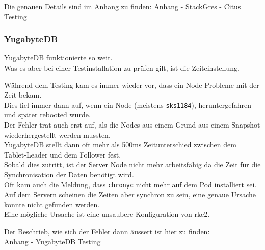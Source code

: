 \begin{flushleft}
    
    Die genauen Details sind im Anhang zu finden:
    \hyperref[subsec:appendix_testing_stackgres_citus]{Anhang - StackGres - Citus Testing}
\end{flushleft}
\begin{flushleft}
    \subsubsection{YugabyteDB}
    YugabyteDB funktionierte so weit.\\
    
    Was es aber bei einer Testinstallation zu prüfen gilt, ist die Zeiteinstellung.
\end{flushleft}
\begin{flushleft}
    Während dem Testing kam es immer wieder vor, dass ein Node Probleme mit der Zeit bekam.\\
    Dies fiel immer dann auf, wenn ein Node (meistens \texttt{sks1184}), heruntergefahren und später rebooted wurde.\\
    Der Fehler trat auch erst auf, als die Nodes aus einem Grund aus einem Snapshot wiederhergestellt werden mussten.\\
    YugabyteDB stellt dann oft mehr als 500ms Zeitunterschied zwischen dem Tablet-Leader und dem Follower fest.\\
    Sobald dies zutritt, ist der Server Node nicht mehr arbeitsfähig da die Zeit für die Synchronisation der Daten benötigt wird\cite{BYH9Z3MS}.\\
    Oft kam auch die Meldung, dass \texttt{chronyc} nicht mehr auf dem Pod installiert sei.\\
    Auf dem Servern scheinen die Zeiten aber synchron zu sein, eine genaue Ursache konnte nicht gefunden werden.\\
    Eine mögliche Ursache ist eine unsaubere Konfiguration von \gls{rke2}.
\end{flushleft}
\begin{flushleft}
    Der Beschrieb, wie sich der Fehler dann äussert ist hier zu finden:\\
    \hyperref[subsec:appendix_testing_yugabytedb]{Anhang - YugabyteDB Testing}
\end{flushleft}